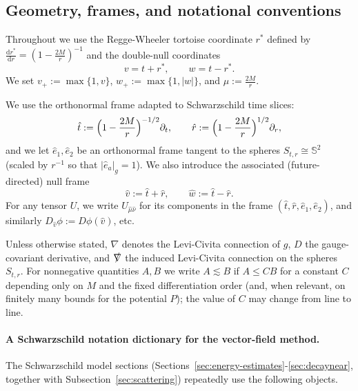 \documentclass[11pt]{article}
\numberwithin{equation}{section}
\theoremstyle{plain}
\theoremstyle{definition}
\theoremstyle{remark}
\newcommand{\dd}{\mathrm{d}}
\newcommand{\vplus}{v_{+}}
\newcommand{\wplus}{w_{+}}
\begin{document}
\subsection{Geometry, frames, and notational conventions}\label{subsec:notation}

Throughout we use the Regge-Wheeler tortoise coordinate $r^{\ast}$ defined by $\frac{\dd r^{\ast}}{\dd r}=(1-\frac{2M}{r})^{-1}$ and the double-null coordinates
\begin{equation}
v=t+r^{\ast},\qquad w=t-r^{\ast}.
\end{equation}
We set $\vplus:=\max\{1,v\}$, $\wplus:=\max\{1,|w|\}$, and $\mu:=\frac{2M}{r}$.

We use the orthonormal frame adapted to Schwarzschild time slices:
\begin{equation}
\hat t := \Bigl(1-\frac{2M}{r}\Bigr)^{-1/2}\partial_t,
\qquad
\hat r := \Bigl(1-\frac{2M}{r}\Bigr)^{1/2}\partial_r,
\end{equation}
and we let $\hat e_1,\hat e_2$ be an orthonormal frame tangent to the spheres $S_{t,r}\cong\mathbb S^{2}$ (scaled by $r^{-1}$ so that $|\hat e_a|_g=1$).
We also introduce the associated (future-directed) null frame
\begin{equation}
\hat v := \hat t+\hat r,
\qquad
\hat w := \hat t-\hat r.
\end{equation}
For any tensor $U$, we write $U_{\hat\mu\hat\nu}$ for its components in the frame $(\hat t,\hat r,\hat e_1,\hat e_2)$, and similarly $D_{\hat v}\phi:=D\phi(\hat v)$, etc.

Unless otherwise stated, $\nabla$ denotes the Levi-Civita connection of $g$, $D$ the gauge-covariant derivative, and $\slashed{\nabla}$ the induced Levi-Civita connection on the spheres $S_{t,r}$.
For nonnegative quantities $A,B$ we write $A\lesssim B$ if $A\le C B$ for a constant $C$ depending only on $M$ and the fixed differentiation order (and, when relevant, on finitely many bounds for the potential $P$); the value of $C$ may change from line to line.


\paragraph{A Schwarzschild notation dictionary for the vector-field method.}
The Schwarzschild model sections (Sections~\ref{sec:energy-estimates}-\ref{sec:decaynear}, together with Subsection~\ref{sec:scattering}) repeatedly use the following objects.
\end{document}
